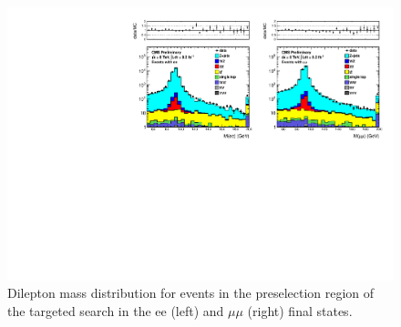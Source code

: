 \begin{figure}[hbt]
  \begin{center}
	\includegraphics[width=1.0\linewidth]{plots/dilmass_2jets_92fb_bvetoMedium.pdf}
	\caption{
	  \label{fig:dilmass_2j_targeted}\protect 
	  Dilepton mass distribution for events in the preselection region of the targeted search
	  in the ee (left) and $\mu\mu$ (right) final states.}



  \end{center}
\end{figure}

